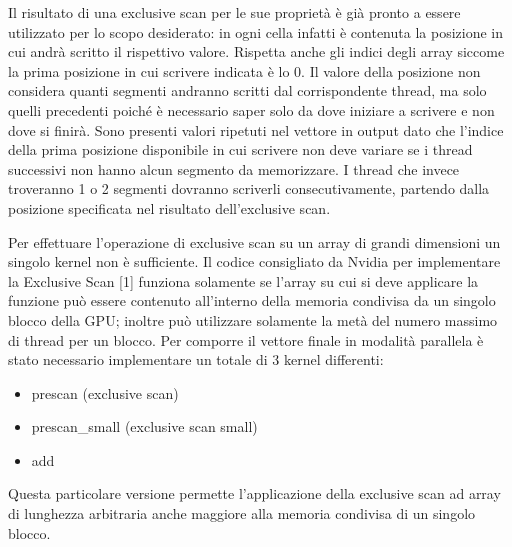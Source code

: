 \documentclass[12pt,a4paper]{report}
\begin{document}
\begin{figure}[H]
\centering
\begin{floatrow}[1]
\end{floatrow}
\end{figure} 
Il risultato di una exclusive scan per le sue proprietà è già pronto a essere utilizzato per lo scopo desiderato: in ogni cella infatti è contenuta la posizione in cui andrà scritto il rispettivo valore. Rispetta anche gli indici degli array siccome la prima posizione in cui scrivere indicata è lo 0. Il valore della posizione non considera quanti segmenti andranno scritti dal corrispondente thread, ma solo quelli precedenti poiché è necessario saper solo da dove iniziare a scrivere e non dove si finirà. \newline
Sono presenti valori ripetuti nel vettore in output dato che l'indice della prima posizione disponibile in cui scrivere non deve variare se i thread successivi non hanno alcun segmento da memorizzare. I thread che invece troveranno 1 o 2 segmenti dovranno scriverli consecutivamente, partendo dalla posizione specificata nel risultato dell'exclusive scan. \newpage

Per effettuare l'operazione di exclusive scan su un array di grandi dimensioni un singolo kernel non è sufficiente.
Il codice consigliato da Nvidia per implementare la Exclusive Scan [1] funziona solamente se l’array su cui si deve applicare la funzione può essere contenuto all’interno della memoria condivisa da un singolo blocco della GPU; inoltre può utilizzare solamente la metà del numero massimo di thread per un blocco. \newline
Per comporre il vettore finale in modalità parallela è stato necessario implementare un totale di 3 kernel differenti:
\begin{itemize}
    \item prescan (exclusive scan)
    \item prescan\_small  (exclusive scan small)
    \item add
\end{itemize}
Questa particolare versione permette l'applicazione della exclusive scan ad array di lunghezza arbitraria anche maggiore alla memoria condivisa di un singolo blocco. \newline
\end{document}
